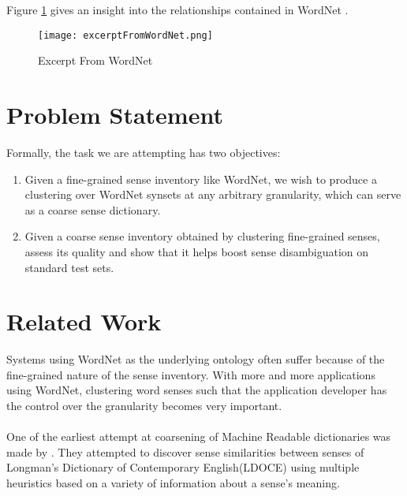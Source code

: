 Figure \ref{fig:excerptFromWordNet} gives an insight into the relationships contained in WordNet \citep{navigli2009WSDSurvey}.
\begin{figure}[h]
\begin{center}
\texttt{[image: excerptFromWordNet.png]}
\caption{Excerpt From WordNet}
\label{fig:excerptFromWordNet}
\end{center}
\end{figure}

\section{Problem Statement}


Formally, the task we are attempting has two objectives: 
\begin{enumerate}
\item Given a fine-grained sense inventory like WordNet, we wish to produce a clustering over WordNet synsets at any arbitrary granularity, which can serve as a coarse sense dictionary. 
\item Given a coarse sense inventory obtained by clustering fine-grained senses, assess its quality and show that it helps boost sense disambiguation on standard test sets.
\end{enumerate}

\section{Related Work}
\label{chapter:Background}
Systems using WordNet as the underlying ontology often suffer because of the fine-grained nature of the sense inventory. With more and more applications using WordNet, clustering word senses such that the application developer has the control over the granularity becomes very important.

\paragraph{}
One of the earliest attempt at coarsening of Machine Readable dictionaries was made by \citep{Dolan:1994}. 
They attempted to discover sense similarities between senses of Longman's Dictionary of Contemporary English(LDOCE) using multiple heuristics based on a variety of information about a sense's meaning.

